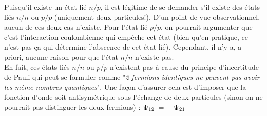 Puisqu'il existe un état lié $n/p$, il est légitime de se demander s'il existe des états liés $n/n$ ou $p/p$ (uniquement deux particules!). D'un point de vue observationnel, aucun de ces deux cas n'existe. Pour l'état lié $p/p$, on pourrait argumenter que c'est l'interaction coulombienne qui empêche cet état (bien qu'en pratique, ce n'est pas ça qui détermine l'abscence de cet état lié). Cependant, il n'y a, a priori, aucune raison pour que l'état $n/n$ n'existe pas.\\
En fait, ces états liés $n/n$ ou $p/p$ n'existent pas à cause du principe d'incertitude de Pauli qui peut se formuler comme "\textit{2 fermions identiques ne peuvent pas avoir les même nombres quantiques}". Une façon d'assurer cela est d'imposer que la fonction d'onde soit antisymétrique sous l'échange de deux particules (sinon on ne pourrait pas distinguer les deux fermions) : $\Psi_{12} \; = \; -\Psi_{21}$\\

